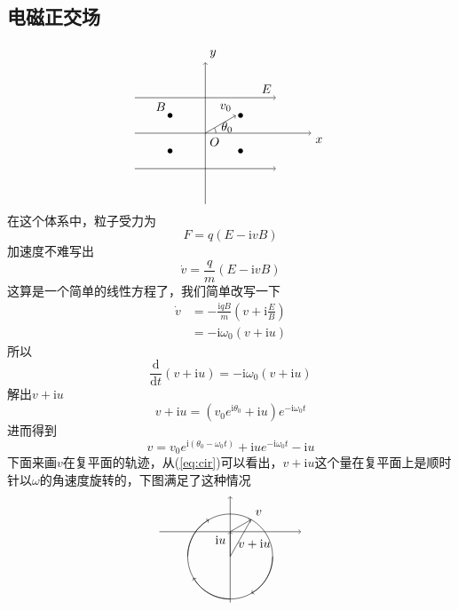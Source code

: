 \documentclass[UTF8]{ctexart}
\begin{document}
\subsection{电磁正交场}
\[
\begin{tikzpicture}
    \draw[->] (-2,1) -- (2,1); 
    \draw[->] (-2,0) -- (3,0); 
    \draw[->] (-2,-1) -- (2,-1); 
    \draw[->] (0,-2) -- (0,2);
    \node[above left] (A) at (2,1) {$E$};
    \node[below right] (B) at (3,0) {$x$};
    \node[above right] (C) at (0,2) {$y$};
    \node[below right] (O) at (0,0) {$O$};
    \fill (-1,0.5) circle (2pt);
    \fill (-1,-0.5) circle (2pt);
    \fill (1,0.5) circle (2pt);
    \fill (1,-0.5) circle (2pt);
    \node[above left] (A) at (-1,0.5) {$B$};
    \draw[->] (0,0) -- (30:1);
    \node[above left] (O) at (30:1) {$v_0$};
    \node[below right] (O) at (0.33,0.44) {$\theta_0$};
    \draw (0:0.3) arc [start angle=0, end angle=30, radius=0.3cm];
\end{tikzpicture}
\]
在这个体系中，粒子受力为
\[F = q(E - \mathrm{i} v B)\]
加速度不难写出
\[\dot{v}=\frac{q}{m}(E - \mathrm{i} v B)\]
这算是一个简单的线性方程了，我们简单改写一下
\begin{align*}
    \dot{v}&=-\frac{\mathrm{i} qB}{m}(v+\mathrm{i} \frac{E}{B})\\
    &=-\mathrm{i} \omega_0(v+\mathrm{i} u)
\end{align*}
所以
\[\frac{\mathrm{d}}{\mathrm{d} t}(v+\mathrm{i} u) =-\mathrm{i} \omega_0(v+\mathrm{i} u)\]
解出\(v+\mathrm{i} u\)
\begin{equation}
    v+\mathrm{i} u = (v_0 e^{\mathrm{i} \theta_0}+\mathrm{i} u)e^{-\mathrm{i} \omega_0 t} \label{eq:cir}
\end{equation}
进而得到
\[v=v_0 e^{\mathrm{i} (\theta_0- \omega_0 t)}+\mathrm{i} ue^{-\mathrm{i} \omega_0 t}-\mathrm{i} u \]
下面来画\(v\)在复平面的轨迹，从(\ref{eq:cir})可以看出，\(v+\mathrm{i} u\)这个量在复平面上是顺时针以\(\omega\)的角速度旋转的，下图满足了这种情况
\[
\begin{tikzpicture}
    \draw[->] (-2,0) -- (2,0); 
    \draw[->] (0,-2) -- (0,1);
    \draw[->] (0,0) -- (30:0.68);
    \draw[->] (0,-0.7) -- (0,0);
    \draw (0,-0.7) circle (1.2cm);
    \draw (0,-0.7) -- (30:0.68);
    \node[below left] (O) at (0,0) {$\mathrm{i} u$};
    \node[above right] (A) at (30:0.68) {$v$};
    \node[below right] (B) at (0.1,-0.1) {$v+\mathrm{i} u$};
    \draw[->] (1.2,-0.7) arc [start angle=0, end angle=-60, radius=1.2cm];
    \draw[->] (0,-1.9) arc [start angle=-90, end angle=-150, radius=1.2cm];
    \draw[->] (-1.2,-0.7) arc [start angle=180, end angle=120, radius=1.2cm];
\end{tikzpicture}
\]
\end{document}
